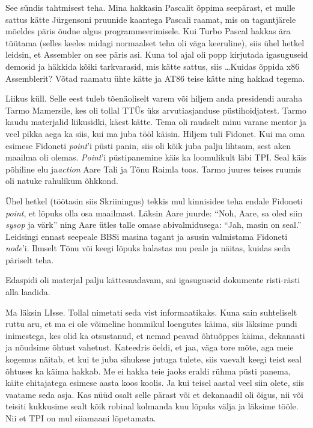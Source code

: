 
See sündis tahtmisest teha. Mina hakkasin  
Pascalit õppima seepärast, et 
mulle sattus kätte Jürgensoni pruunide kaantega Pascali  
raamat, mis on tagantjärele mõeldes 
päris õudne algus programmeerimisele. Kui 
Turbo Pascal hakkas ära tüütama (selles 
keeles midagi normaalset teha oli väga keeruline), siis ühel hetkel 
leidsin, et Assembler on see päris asi. Kuna tol 
ajal oli popp kirjutada igasuguseid demosid ja häkkida kõiki tarkvarasid, mis 
kätte sattus, siis \ldots Kuidas õppida x86 
Assemblerit? Võtad raamatu ühte kätte ja AT86 teise kätte ning hakkad tegema.


Liikus küll. Selle eest tuleb tõenäoliselt varem või hiljem anda
presidendi auraha Tarmo Mamersile, kes oli tollal 
TTÜs üks arvutiasjanduse püstihoidjatest. 
Tarmo kaudu materjalid liikusidki, käest kätte. Tema oli raudselt minu varane 
mentor ja veel pikka aega ka siis, kui ma 
juba tööl käisin. Hiljem tuli 
Fidonet. Kui ma oma esimese Fidoneti \emph{point}'i 
püsti panin, siis oli kõik juba palju lihtsam, sest aken maailma oli
olemas. \emph{Point}'i püstipanemine käis ka loomulikult läbi TPI. Seal käis 
põhiline elu ja\emph{action}   
Aare Tali\label{sisu!aare_tali} ja Tõnu 
Raimla toas. Tarmo juures teises ruumis oli natuke 
rahulikum 
õhkkond. 

Ühel  
hetkel (töötasin siis Skriiningus) tekkis mul kinnisidee teha 
endale Fidoneti \emph{point}, et 
lõpuks olla osa maailmast. Läksin Aare juurde: \enquote{Noh, Aare, 
sa oled siin \emph{sysop} ja värk} ning Aare ütles talle omase abivalmidusega: 
\enquote{Jah, masin on seal.} Leidsingi ennast seepeale BBSi masina tagant ja 
asusin
valmistama Fidoneti \emph{node}'i. Ilmselt Tõnu või keegi 
lõpuks halastas mu peale ja näitas, kuidas seda päriselt teha. 

Edaspidi oli materjal palju kättesaadavam, sai 
igasuguseid dokumente risti-rästi alla laadida. 


Ma läksin LIsse. Tollal nimetati seda vist informaatikaks. 
Kuna sain suhteliselt ruttu aru, et ma ei ole võimeline hommikul loengutes 
käima, siis läksime pundi inimestega, kes olid ka otsustanud, et nemad 
peavad õhtuõppes käima, dekanaati ja nõudsime õhtust vahetust. Kateedris öeldi, 
et jaa, väga tore mõte, aga 
meie kogemus näitab, et kui te juba sihukese jutuga tulete, siis vaevalt keegi 
teist seal õhtuses ka käima hakkab. Me ei hakka teie jaoks  
eraldi rühma püsti panema, käite ehitajatega esimese aasta koos koolis. Ja kui 
teisel aastal veel siin olete, siis vaatame seda asja. Kas nüüd osalt selle 
pärast või et dekanaadil oli õigus, nii või teisiti kukkusime 
sealt kõik robinal kolmanda kuu lõpuks välja ja läksime tööle. Nii 
et TPI on mul siiamaani lõpetamata. 

